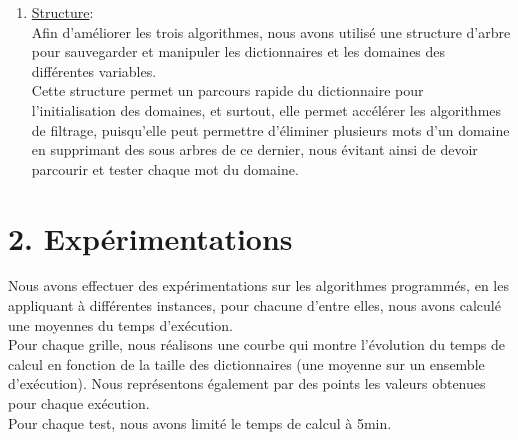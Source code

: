 \documentclass[a4paper,12pt]{report}
\begin{document}
\begin{enumerate}
\item \ul{Structure}:\\Afin d'améliorer les trois algorithmes, nous avons utilisé une structure d'arbre pour sauvegarder et manipuler les dictionnaires et les domaines des différentes variables.\\
 Cette structure permet un parcours rapide du dictionnaire pour l'initialisation des domaines, et surtout, elle permet accélérer les algorithmes de filtrage, puisqu'elle peut permettre d'éliminer plusieurs mots d'un domaine en supprimant des sous arbres de ce dernier, nous évitant ainsi de devoir parcourir et tester chaque mot du domaine.\\
\end{enumerate}

\section*{2. Expérimentations}


Nous avons effectuer des expérimentations sur les algorithmes programmés, en les appliquant à différentes instances, pour chacune d'entre elles, nous avons calculé une moyennes du temps d'exécution.\\
Pour chaque grille, nous réalisons une courbe qui montre l'évolution du temps de calcul en fonction de la taille des dictionnaires (une moyenne sur un ensemble d'exécution). Nous représentons également par des points les valeurs obtenues pour chaque exécution.\\
Pour chaque test, nous avons limité le temps de calcul à 5min.
\end{document}
